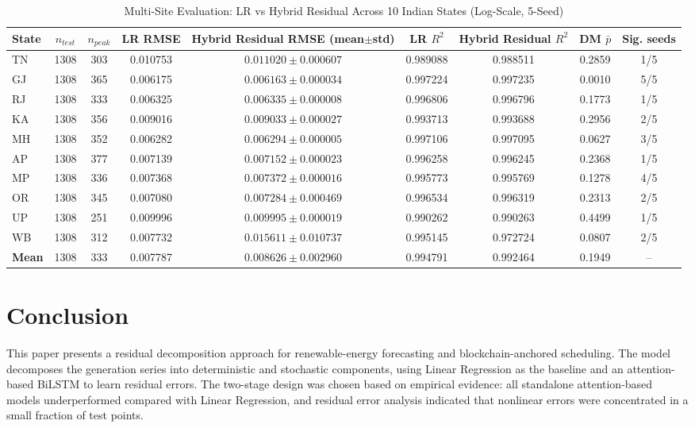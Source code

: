 \documentclass{ieeeaccess}
\begin{document}
\begin{table}[!t]
\caption{Multi-Site Evaluation: LR vs Hybrid Residual Across 10 Indian States (Log-Scale, 5-Seed)}
\label{tab:multisite}
\centering
\begin{tabular}{lcccccccc}
\toprule
State & $n_{test}$ & $n_{peak}$ & LR RMSE & Hybrid Residual RMSE (mean$\pm$std) & LR $R^2$ & Hybrid Residual $R^2$ & DM $\bar{p}$ & Sig. seeds \\
\midrule
TN & 1308 & 303 & 0.010753 & $0.011020 \pm 0.000607$ & 0.989088 & 0.988511 & 0.2859 & 1/5 \\
GJ & 1308 & 365 & 0.006175 & $0.006163 \pm 0.000034$ & 0.997224 & 0.997235 & 0.0010 & 5/5 \\
RJ & 1308 & 333 & 0.006325 & $0.006335 \pm 0.000008$ & 0.996806 & 0.996796 & 0.1773 & 1/5 \\
KA & 1308 & 356 & 0.009016 & $0.009033 \pm 0.000027$ & 0.993713 & 0.993688 & 0.2956 & 2/5 \\
MH & 1308 & 352 & 0.006282 & $0.006294 \pm 0.000005$ & 0.997106 & 0.997095 & 0.0627 & 3/5 \\
AP & 1308 & 377 & 0.007139 & $0.007152 \pm 0.000023$ & 0.996258 & 0.996245 & 0.2368 & 1/5 \\
MP & 1308 & 336 & 0.007368 & $0.007372 \pm 0.000016$ & 0.995773 & 0.995769 & 0.1278 & 4/5 \\
OR & 1308 & 345 & 0.007080 & $0.007284 \pm 0.000469$ & 0.996534 & 0.996319 & 0.2313 & 2/5 \\
UP & 1308 & 251 & 0.009996 & $0.009995 \pm 0.000019$ & 0.990262 & 0.990263 & 0.4499 & 1/5 \\
WB & 1308 & 312 & 0.007732 & $0.015611 \pm 0.010737$ & 0.995145 & 0.972724 & 0.0807 & 2/5 \\
\midrule
\textbf{Mean} & 1308 & 333 & 0.007787 & $0.008626 \pm 0.002960$ & 0.994791 & 0.992464 & 0.1949 & -- \\
\bottomrule
\end{tabular}
\end{table}


\section{Conclusion}
This paper presents a residual decomposition approach for renewable-energy forecasting and blockchain-anchored scheduling. The model decomposes the generation series into deterministic and stochastic components, using Linear Regression as the baseline and an attention-based BiLSTM to learn residual errors. The two-stage design was chosen based on empirical evidence: all standalone attention-based models underperformed compared with Linear Regression, and residual error analysis indicated that nonlinear errors were concentrated in a small fraction of test points.
\end{document}
